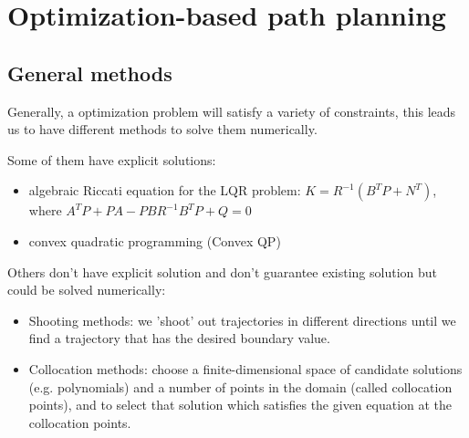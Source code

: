 \documentclass{beamer}
\begin{document}
\section{Optimization-based path planning}
\subsection{General methods}
\begin{frame}
	Generally, a optimization problem will satisfy a variety of constraints, this leads us to have different methods to solve them numerically.
	
	Some of them have explicit solutions:
	\begin{itemize}
		\item algebraic Riccati equation for the LQR problem: $K = R^{-1} (B^T P + N^T)$, where $A^T P + P A - P B R^{-1} B^T P + Q = 0$
		\item convex quadratic programming (Convex QP)
	\end{itemize}
\end{frame}

\begin{frame}
	Others don't have explicit solution and don't guarantee existing solution but could be solved numerically:
	\begin{itemize}
		\item Shooting methods: we 'shoot' out trajectories in different directions until we find a trajectory that has the desired boundary value.
		\item Collocation methods: choose a finite-dimensional space of candidate solutions (e.g. polynomials) and a number of points in the domain (called collocation points), and to select that solution which satisfies the given equation at the collocation points.
	\end{itemize}
\end{frame}
\end{document}
